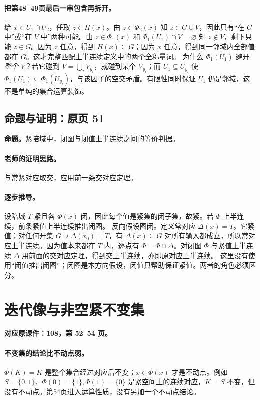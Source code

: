 \paragraph{把第48--49页最后一串包含再拆开。}
给 $x\in U_1\cap U_2$，任取 $z\in H(x)$。由 $z\in\Phi_2(x)$ 知 $z\in G\cup V$，因此只有“在 $G$ 中”或“在 $V$ 中”两种可能。由 $z\in\Phi_1(x)$ 和 $\Phi_1(U_1)\cap V=\varnothing$ 知 $z\notin V$，剩下只能 $z\in G$。因为 $z$ 任意，得到 $H(x)\subseteq G$；因为 $x$ 任意，得到同一邻域内全部值都在 $G$。这才完整匹配上半连续定义中的两个全称量词。
为什么 $\Phi_1(U_1)$ 避开\emph{整个} $V$？若它碰到 $V=\bigcup_i V_{y_i}$，就碰到某个 $V_{y_i}$；而 $U_1\subseteq U_{y_i}$ 使 $\Phi_1(U_1)\subseteq\Phi_1(U_{y_i})$，与该因子的空交矛盾。有限性同时保证 $U_1$ 仍是邻域，这不是单纯的集合运算装饰。


\subsection{命题与证明：原页 51}

\textbf{命题。}紧陪域中，闭图与闭值上半连续之间的等价判据。

\paragraph{老师的证明思路。}与常紧对应取交，应用前一条交对应定理。

\paragraph{逐步推导。}
设陪域 $T$ 紧且各 $\Phi(x)$ 闭，因此每个值是紧集的闭子集，故紧。若 $\Phi$ 上半连续，前条紧值上半连续推出闭图。
反向假设图闭。定义常对应 $\Delta(x)=T$。它紧值；对任何开集 $G\supseteq\Delta(x_0)=T$，有 $\Delta(x)\subseteq G$ 对所有输入都成立，所以常对应上半连续。因为值本来都在 $T$ 内，逐点有 $\Phi=\Phi\cap\Delta$。对闭图 $\Phi$ 与紧值上半连续 $\Delta$ 用前面的交对应定理，得到交上半连续，亦即原对应上半连续。
这里没有使用“闭值推出闭图”；闭图是本方向假设，闭值只帮助保证紧值。两者的角色必须区分。


\clearpage\section{迭代像与非空紧不变集}\label{g:108:52}

\textbf{对应原课件：108，第 52--54 页。}


\paragraph{不变集的结论比不动点弱。}
$\Phi(K)=K$ 是整个集合经过对应后不变；$x\in\Phi(x)$ 才是不动点。例如 $S=\{0,1\}$、$\Phi(0)=\{1\},\Phi(1)=\{0\}$ 是紧空间上的连续对应，$K=S$ 不变，但没有不动点。第54页进入运算性质，没有另加一个不动点结论。


